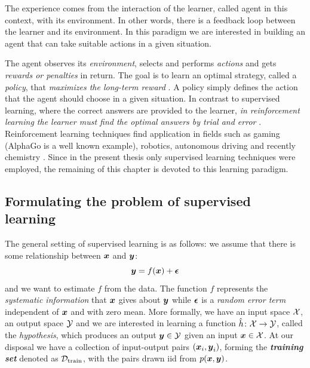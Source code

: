 \begin{definition}
	The experience comes from the interaction of the learner, called
	agent in this context, with its environment. In other words,
	there is a feedback loop between the learner and its environment. In this
	paradigm we are interested in building an agent that can take suitable
	actions in a given situation.
\end{definition}

The agent observes its \emph{environment}, selects and performs \emph{actions}
and gets \emph{rewards or penalties} in return. The goal is to learn an optimal
strategy, called a \emph{policy}, that \emph{maximizes the long-term reward}
\parencite{ml}. A policy simply defines the action that the agent should
choose in a given situation. In contrast to supervised learning, where the
correct answers are provided to the learner, \emph{in reinforcement learning the
learner must find the optimal answers by trial and error}
\parencite{bishop2007}. Reinforcement learning techniques find application in
fields such as gaming (AlphaGo is a well known example), robotics, autonomous
driving and recently chemistry \parencite{li, Gow2022}. Since in the present
thesis only supervised learning techniques were employed, the remaining of this
chapter is devoted to this learning paradigm.

\subsection{Formulating the problem of supervised learning}
\label{subsec:supervised_learning}

The general setting of supervised learning is as follows: we assume that there
is some relationship between $\boldsymbol{x}$ and $\boldsymbol{y}$:
\begin{equation}
	\label{eq:supervised}
	\boldsymbol{y} = f(\boldsymbol{x}) + \boldsymbol{\epsilon}
\end{equation}
and we want to estimate $f$ from the data. The function $f$ represents the
\emph{systematic information} that $\boldsymbol{x}$ gives about $\boldsymbol{y}$ while
$\boldsymbol{\epsilon}$ is a \emph{random error term}
independent of $\boldsymbol{x}$ and with zero mean. More formally, we have an input space
$\mathcal{X}$, an output space $\mathcal{Y}$ and we are interested in learning a
function $\hat{h} \colon \mathcal{X} \to \mathcal{Y}$, called the
\emph{hypothesis}, which produces an output $\boldsymbol{y} \in \mathcal{Y}$
given an input $\boldsymbol{x} \in \mathcal{X}$.  At our disposal we have a collection of
input-output pairs $(\boldsymbol{x}_i, \boldsymbol{y}_i)$, forming the \emph{\textbf{training
set}} denoted as $\mathcal{D}_\text{train}$, with the pairs drawn
\acrshort{iid} from $p(\boldsymbol{x}, \boldsymbol{y})$.

